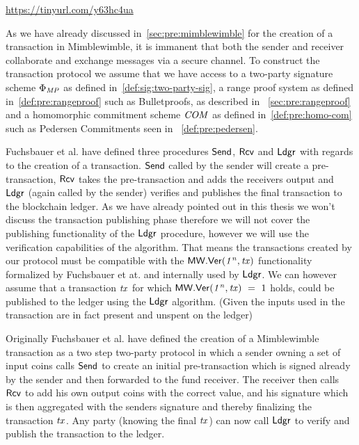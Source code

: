 \urldef\urlgrinexplained\url{https://tinyurl.com/y63hc4ua}

As we have already discussed in~\cref{sec:pre:mimblewimble} for the creation of a transaction in Mimblewimble, it is immanent that both the sender and receiver collaborate and exchange messages via a secure channel.
To construct the transaction protocol we assume that we have access to a two-party signature scheme $\Phi_{\mathit{MP}}$ as defined in~\cref{def:sig:two-party-sig}, a  range proof system as defined in~\cref{def:pre:rangeproof} such as Bulletproofs, as described in ~\cref{sec:pre:rangeproof} and a homomorphic commitment scheme $\mathit{COM}$ as defined in~\cref{def:pre:homo-com} such as Pedersen Commitments seen in ~\cref{def:pre:pedersen}.

Fuchsbauer et al. have defined three procedures $\mathsf{Send}$, $\mathsf{Rcv}$ and $\mathsf{Ldgr}$ with regards to the creation of a transaction.
$\mathsf{Send}$ called by the sender will create a pre-transaction, $\mathsf{Rcv}$ takes the pre-transaction and adds the receivers output and $\mathsf{Ldgr}$ (again called by the sender) verifies and publishes the final transaction to the blockchain ledger.
As we have already pointed out in this thesis we won't discuss the transaction publishing phase therefore we will not cover the publishing functionality of the $\mathsf{Ldgr}$ procedure, however we will use the verification capabilities of the algorithm.
That means the transactions created by our protocol must be compatible with the $\mathsf{MW.Ver(\mathit{1^n}, \mathit{tx})}$ functionality formalized by Fuchsbauer et at. and internally used by $\mathsf{Ldgr}$.
We can however assume that a transaction $\mathit{tx}$ for which $\mathsf{MW.Ver(\mathit{1^n}, \mathit{tx})} ~=~ 1$ holds, could be published to the ledger using the $\mathsf{Ldgr}$ algorithm. (Given the inputs used in the transaction are in fact present and unspent on the ledger)

Originally Fuchsbauer et al. have defined the creation of a Mimblewimble transaction as a two step two-party protocol in which a sender owning a set of input coins calls $\mathsf{Send}$ to create an initial pre-transaction which is signed already by the sender and then forwarded to the fund receiver.
The receiver then calls $\mathsf{Rcv}$ to add his own output coins with the correct value, and his signature which is then aggregated with the senders signature and thereby finalizing the transaction $\mathit{tx}$.
Any party (knowing the final $\mathit{tx}$) can now call $\mathsf{Ldgr}$ to verify and publish the transaction to the ledger.

